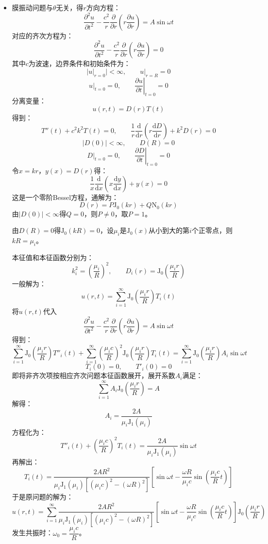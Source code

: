 \documentclass[fontset=windows]{ctexart}
\begin{document}
\begin{itemize}
    \item[8.(1)]
    膜振动问题与$\theta$无关，得$r$方向方程：
    \[
    \frac{\partial^2 u}{\partial t^2} - \frac{c^2}{r}\frac{\partial}{\partial r}\left(r\frac{\partial u}{\partial r}\right) = A\sin\omega t
    \]
    对应的齐次方程为：
    \[
    \frac{\partial^2 u}{\partial t^2} - \frac{c^2}{r}\frac{\partial}{\partial r}\left(r\frac{\partial u}{\partial r}\right) = 0
    \]
    其中$c$为波速，边界条件和初始条件为：
    \[
    \Big|u|_{r=0}\Big| < \infty,\qquad \left.u\right|_{r=R} = 0
    \]
    \[
    \left.u\right|_{t=0} = 0,\qquad \left.\frac{\partial u}{\partial t}\right|_{t=0} = 0
    \]
    分离变量：
    \[
    u(r,t) = D(r)T(t)
    \]
    得到：
    \[
    T''(t) + c^2 k^2 T(t) = 0,\qquad \frac{1}{r}\frac{\mathrm{d}}{\mathrm{d}r}\left(r\frac{\mathrm{d}D}{\mathrm{d}r}\right) + k^2 D(r) = 0
    \]
    \[
    |D(0)| < \infty,\qquad D(R) = 0
    \]
    \[
    \left.D\right|_{t=0} = 0,\qquad \left.\frac{\partial D}{\partial t}\right|_{t=0} = 0
    \]
    令$x = kr$，$y(x) = D(r)$得：
    \[
    \frac{1}{x}\frac{\mathrm{d}}{\mathrm{d}x}\left(x\frac{\mathrm{d}y}{\mathrm{d}x}\right) + y(x) = 0
    \]
    这是一个零阶Bessel方程，通解为：
    \[
    D(r) = P\mathrm{J}_0(kr) + Q\mathrm{N}_0(kr)
    \]
    由$|D(0)| < \infty$得$Q = 0$，则$P \neq 0$，取$P = 1$。

    由$D(R) = 0$得$\mathrm{J}_0(kR) = 0$，设$\mu_i$是$\mathrm{J}_0(x)$从小到大的第$i$个正零点，则$kR = \mu_i$。

    本征值和本征函数分别为：
    \[
    k_i^2 = \left(\frac{\mu_i}{R}\right)^2,\qquad D_i(r) = \mathrm{J}_0\left(\frac{\mu_i r}{R}\right)
    \]
    一般解为：
    \[
    u(r,t) = \sum_{i=1}^{\infty}\mathrm{J}_0\left(\frac{\mu_i r}{R}\right)T_i(t)
    \]
    将$u(r,t)$代入
    \[
    \frac{\partial^2 u}{\partial t^2} - \frac{c^2}{r}\frac{\partial}{\partial r}\left(r\frac{\partial u}{\partial r}\right) = A\sin\omega t
    \]
    得到：
    \[
    \sum_{i=1}^{\infty}\mathrm{J}_0\left(\frac{\mu_i r}{R}\right)T''_i(t) + \sum_{i=1}^{\infty}\left(\frac{\mu_i c}{R}\right)^2\mathrm{J}_0\left(\frac{\mu_i r}{R}\right) T_i(t) = \sum_{i=1}^{\infty}\mathrm{J}_0\left(\frac{\mu_i r}{R}\right)A_i\sin\omega t
    \]
    \[
    T_i(0) = 0,\qquad T'_i(0) = 0
    \]
    即将非齐次项按相应齐次问题本征函数展开，展开系数$A_i$满足：
    \[
    \sum_{i=1}^{\infty}A_i\mathrm{J}_0\left(\frac{\mu_i r}{R}\right) = A
    \]
    解得：
    \[
    A_i = \frac{2A}{\mu_i \mathrm{J}_1(\mu_i)}
    \]
    方程化为：
    \[
    T''_i(t) + \left(\frac{\mu_i c}{R}\right)^2 T_i(t) = \frac{2A}{\mu_i \mathrm{J}_1(\mu_i)}\sin\omega t
    \]
    再解出：
    \[
    T_i(t) = \frac{2AR^2}{\mu_i \mathrm{J}_1(\mu_i)\left[(\mu_i c)^2 - (\omega R)^2\right]}\left[\sin\omega t - \frac{\omega R}{\mu_i c}\sin\left(\frac{\mu_i c}{R}t\right)\right]
    \]
    于是原问题的解为：
    \[
    u(r,t) = \sum_{i=1}^{\infty}\frac{2AR^2}{\mu_i \mathrm{J}_1(\mu_i)\left[(\mu_i c)^2 - (\omega R)^2\right]}\left[\sin\omega t - \frac{\omega R}{\mu_i c}\sin\left(\frac{\mu_i c}{R}t\right)\right]\mathrm{J}_0\left(\frac{\mu_i r}{R}\right)
    \]
    发生共振时：$\omega_0 = \dfrac{\mu_i c}{R}$。


\end{itemize}
\end{document}

